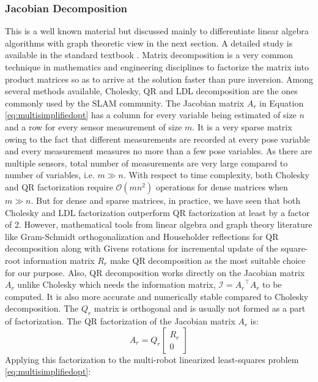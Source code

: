 \subsubsection{Jacobian Decomposition} 
This is a well known material but discussed mainly to differentiate linear algebra algorithms with graph theoretic view in the next section. A detailed study is available in the standard textbook \cite{golubmatrixbook}. Matrix decomposition is a very common technique in mathematics and engineering disciplines to factorize the matrix into product matrices so as to arrive at the solution faster than pure inversion. Among several methods available, Cholesky, QR and LDL \cite{golubmatrixbook} decomposition are the ones commonly used by the SLAM community. The Jacobian matrix $A_r$ in Equation \ref{eq:multisimplifiedopt} has a column for every variable being estimated of size $n$ and a row for every sensor measurement of size $m$. It is a very sparse matrix owing to the fact that different measurements are recorded at every pose variable and every measurement measures no more than a few pose variables. As there are multiple sensors, total number of measurements are very large compared to number of variables, i.e. $m \gg n$. With respect to time complexity, both Cholesky and QR factorization require $\mathcal{O}(mn^2)$ operations for dense matrices when $m \gg n$. But for dense and sparse matrices, in practice, we have seen that both Cholesky and LDL factorization outperform QR factorization at least by a factor of 2. However, mathematical tools from linear algebra and graph theory literature like Gram-Schmidt orthogonalization and Householder reflections for QR decomposition along with Givens rotations \cite{golubmatrixbook} for incremental update of the square-root information matrix $R_r$ make QR decomposition as the most suitable choice for our purpose. Also, QR decomposition works directly on the Jacobian matrix $A_r$ unlike Cholesky which needs the information matrix, $\mathcal{I} = {A_r}^{\top}A_r$ to be computed. It is also more accurate and numerically stable compared to Cholesky decomposition. The $Q_r$ matrix is orthogonal and is usually not formed as a part of factorization. The QR factorization of the Jacobian matrix $A_r$ is:
\begin{equation}
A_r = Q_r \begin{bmatrix}
R_r \\
0
\end{bmatrix}
\end{equation}
Applying this factorization to the multi-robot linearized least-squares problem \ref{eq:multisimplifiedopt}:
